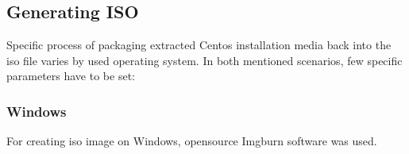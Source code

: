 \documentclass[
  printed, %
  table,   %
  nolof,     %
  nolot,     %
           oneside, color
]{fithesis3}
\renewcommand{\texttt}[1]{%
  \begingroup
  \ttfamily
  \begingroup\lccode`~=`/\lowercase{\endgroup\def~}{/\discretionary{}{}{}}%
  \begingroup\lccode`~=`[\lowercase{\endgroup\def~}{[\discretionary{}{}{}}%
  \begingroup\lccode`~=`.\lowercase{\endgroup\def~}{.\discretionary{}{}{}}%
  \catcode`/=\active\catcode`[=\active\catcode`.=\active
  \scantokens{#1\noexpand}%
  \endgroup
}
\begin{document}
\subsection{Generating ISO}
Specific process of packaging extracted Centos installation media back into the iso file varies by used operating system. In both mentioned scenarios, few specific parameters have to be set:
\subsubsection{Windows}
For creating iso image on Windows, opensource Imgburn software was used. 
\end{document}
